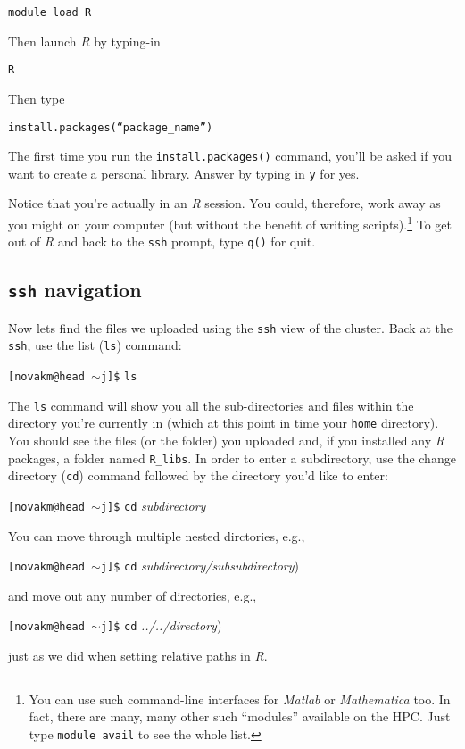 \documentclass[12pt,letterpaper]{article}
\begin{document}
 \texttt{module load R}

 \noindent
 Then launch \emph{R} by typing-in

 \texttt{R}

 \noindent
 Then type

 \texttt{install.packages(``\emph{package\_name}'')}

 \noindent
The first time you run the \texttt{install.packages()} command, you'll be asked if you want to create a personal library.
Answer by typing in \texttt{y} for yes.

\noindent
Notice that you're actually in an \emph{R} session.
You could, therefore, work away as you might on your computer (but without the benefit of writing scripts).\footnote{You can use such command-line interfaces for \emph{Matlab} or \emph{Mathematica} too.
In fact, there are many, many other  such ``modules''  available on the HPC.
Just type \texttt{module avail} to see the whole list.}
To get out of \emph{R} and back to the \texttt{ssh} prompt, type \texttt{q()} for quit.


\subsection{\texttt{ssh} navigation}
Now lets find the files we uploaded using the \texttt{ssh} view of the cluster.
Back at the \texttt{ssh}, use the list (\texttt{ls}) command:

\texttt{[novakm@head $\sim$j]\$} \texttt{ls}

\noindent
The \texttt{ls} command will show you all the sub-directories and files within the directory you're currently in (which at this point in time your \texttt{home} directory).
You should see the files (or the folder) you uploaded and, if you installed any \emph{R} packages, a folder named \texttt{R\_libs}.
In order to enter a subdirectory, use the change directory (\texttt{cd}) command followed by the directory you'd like to enter:

\texttt{[novakm@head $\sim$j]\$} \texttt{cd} \emph{subdirectory}

\noindent
You can move through multiple nested dirctories, e.g.,

\texttt{[novakm@head $\sim$j]\$}  \texttt{cd} \emph{subdirectory/subsubdirectory})

\noindent
and move out any number of directories, e.g.,

\texttt{[novakm@head $\sim$j]\$}  \texttt{cd} \emph{../../directory})

\noindent
just as we did when setting relative paths in \emph{R}.
\end{document}
